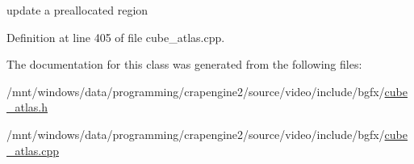 update a preallocated region 



Definition at line 405 of file cube\+\_\+atlas.\+cpp.



The documentation for this class was generated from the following files\+:\begin{DoxyCompactItemize}
\item 
/mnt/windows/data/programming/crapengine2/source/video/include/bgfx/\hyperlink{cube__atlas_8h}{cube\+\_\+atlas.\+h}\item 
/mnt/windows/data/programming/crapengine2/source/video/include/bgfx/\hyperlink{cube__atlas_8cpp}{cube\+\_\+atlas.\+cpp}\end{DoxyCompactItemize}
